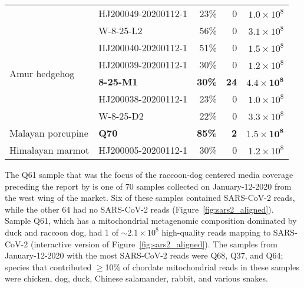 \documentclass[9pt,twocolumn,twoside]{gsajnl_modified}
\begin{document}
\begin{table}
{\begin{tabular}{llrrr}
                 & HJ200049-20200112-1 &                                23\% &                        0 &                     $1.0 \times 10^8$ \\
\cline{1-5}
\multirow{6}{*}{Amur hedgehog} & W-8-25-L2 &                                56\% &                        0 &                   $3.1 \times 10^8$ \\
                 & HJ200040-20200112-1 &                                51\% &                        0 &                   $1.5 \times 10^8$ \\
                 & HJ200039-20200112-1 &                                30\% &                        0 &                   $1.2 \times 10^8$ \\
                 & {\bf 8-25-M1} &                                {\bf 30\%} &                      {\bf 24} &                   $\mathbf{4.4 \times 10^8}$ \\
                 & HJ200038-20200112-1 &                                23\% &                        0 &                     $1.0 \times 10^8$ \\
                 & W-8-25-D2 &                                22\% &                        0 &                   $3.3 \times 10^8$ \\
\cline{1-5}
Malayan porcupine & {\bf Q70} &                                {\bf 85\%} &                        {\bf 2} &                   $\mathbf{1.5 \times 10^8}$ \\
\cline{1-5}
Himalayan marmot & HJ200005-20200112-1 &                                30\% &                        0 &                   $1.2 \times 10^8$ \\
\bottomrule
\end{tabular}
}
\end{table}

The Q61 sample that was the focus of the raccoon-dog centered media coverage~\citep{wu2023atlantic,mueller2023nytimes} preceding the report by \citet{crits2023genetic} is one of 70 samples collected on January-12-2020 from the west wing of the market.
Six of these samples contained SARS-CoV-2 reads, while the other 64 had no SARS-CoV-2 reads (Figure~\ref{fig:sars2_aligned}).
Sample Q61, which has a mitochondrial metagenomic composition dominated by duck and raccoon dog, had 1 of $\sim2.1 \times 10^8$ high-quality reads mapping to SARS-CoV-2 (interactive version of Figure~\ref{fig:sars2_aligned}).
The samples from January-12-2020 with the most SARS-CoV-2 reads were Q68, Q37, and Q64; species that contributed $\ge$10\% of chordate mitochondrial reads in these samples were chicken, dog, duck, Chinese salamander, rabbit, and various snakes.
\end{document}
